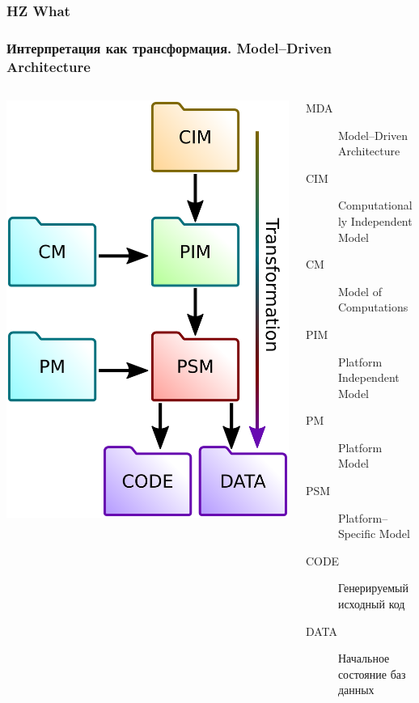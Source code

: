 \documentclass[10pt]{beamer}
\begin{document}
\begin{frame}
  \frametitle{HZ What}
\end{frame}


\begin{frame}[fragile]
  \frametitle{Интерпретация как трансформация. Model--Driven Architecture}
  \begin{columns}
    \begin{column}{0.4\textwidth}
      \includegraphics[width=1\linewidth]{mda-most-general.pdf}
    \end{column}
    \begin{column}{0.7\linewidth}
      \begin{description}
      \item[MDA] Model--Driven Architecture
      \item[CIM] Computationally Independent Model
      \item[CM] Model of Computations
      \item[PIM] Platform Independent Model
      \item[PM] Platform Model
      \item[PSM] Platform--Specific Model
      \item[CODE] Генерируемый исходный код
      \item[DATA] Начальное состояние баз данных
      \end{description}
    \end{column}
  \end{columns}
\end{frame}
\end{document}
